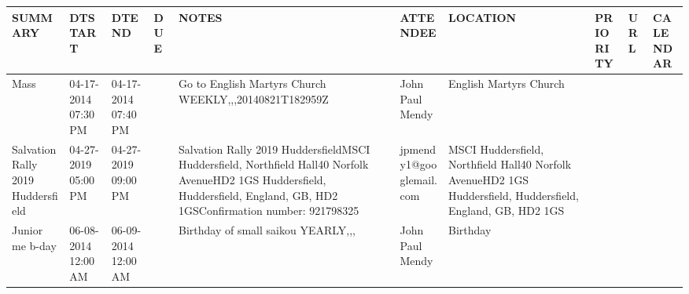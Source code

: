\documentclass{article}%
\begin{document}
%
\normalsize%
\begin{tabular}{|l|l|l|l|l|l|l|l|l|l|}%
\hline%
SUMMARY&DTSTART&DTEND&DUE&NOTES&ATTENDEE&LOCATION&PRIORITY&URL&CALENDAR\\%
\hline%
Mass&04{-}17{-}2014 07:30 PM&04{-}17{-}2014 07:40 PM&&Go to English Martyrs Church WEEKLY,,,20140821T182959Z&John Paul Mendy&English Martyrs Church&&&\\%
\hline%
Salvation Rally 2019  Huddersfield&04{-}27{-}2019 05:00 PM&04{-}27{-}2019 09:00 PM&&Salvation Rally 2019  HuddersfieldMSCI Huddersfield, Northfield Hall40 Norfolk AvenueHD2 1GS Huddersfield, Huddersfield, England, GB, HD2 1GSConfirmation number: 921798325 &jpmendy1@googlemail.com&MSCI Huddersfield, Northfield Hall40 Norfolk AvenueHD2 1GS Huddersfield, Huddersfield, England, GB, HD2 1GS&&&\\%
\hline%
Junior me b{-}day&06{-}08{-}2014 12:00 AM&06{-}09{-}2014 12:00 AM&&Birthday of small saikou YEARLY,,,&John Paul Mendy&Birthday&&&\\%
\hline%
\end{tabular}%
\end{document}
